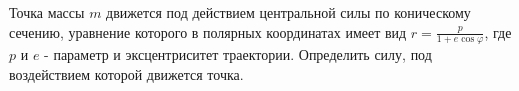Точка массы $m$ движется под действием центральной силы по коническому сечению, уравнение которого в полярных координатах имеет вид $r = \frac{p}{1 + e\cos{\varphi}}$, где $p$ и $e$ - параметр и эксцентриситет траектории. Определить силу, под воздействием которой движется точка.
